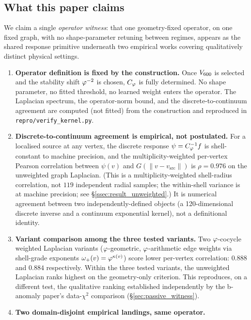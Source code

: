 \subsection*{What this paper claims}

We claim a single \emph{operator witness}: that one geometry-fixed
operator, on one fixed graph, with no shape-parameter retuning
between regimes, appears as the shared response primitive
underneath two
empirical works covering qualitatively distinct physical settings.

\begin{enumerate}\itemsep=2pt
\item \textbf{Operator definition is fixed by the construction.}
  Once $V_{600}$ is selected and the stability shift
  $\varphi^{-2}$ is chosen, $C_{\varphi}$ is fully determined. No shape
  parameter, no fitted threshold, no learned weight enters the
  operator. The Laplacian spectrum, the operator-norm bound, and
  the discrete-to-continuum agreement are computed (not fitted)
  from the construction and reproduced in
  \texttt{repro/verify\_kernel.py}.
\item \textbf{Discrete-to-continuum agreement is empirical, not
  postulated.} For a localised source at any vertex, the discrete
  response $\psi = C_{\varphi}^{-1} f$ is shell-constant to machine
  precision, and the multiplicity-weighted per-vertex Pearson
  correlation between $\psi(v)$ and $G(\|v - v_{\mathrm{src}}\|)$
  is $\rho = 0.976$ on the unweighted graph Laplacian. (This is a
  multiplicity-weighted shell-radius correlation, not $119$
  independent radial samples; the within-shell variance is at
  machine precision; see \S\ref{ssec:result_unweighted}.) It is
  numerical agreement between two independently-defined objects
  (a 120-dimensional discrete inverse and a continuum exponential
  kernel), not a definitional identity.
\item \textbf{Variant comparison among the three tested variants.}
  Two $\varphi$-cocycle weighted Laplacian variants ($\varphi$-geometric,
  $\varphi$-arithmetic edge weights via shell-grade exponents
  $\omega_{+}(v) = \varphi^{\kappa(v)}$) score lower per-vertex
  correlation: $0.888$ and $0.884$ respectively. Within the three
  tested variants, the unweighted Laplacian ranks highest on the
  geometry-only criterion. This reproduces,
  on a different test, the qualitative ranking established
  independently by the b-anomaly paper's data-$\chi^{2}$ comparison
  (\S\ref{sec:passive_witness}).
\item \textbf{Two domain-disjoint empirical landings, same operator.}

\end{enumerate}
